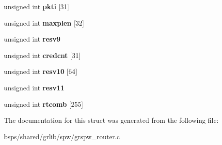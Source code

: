 \begin{DoxyCompactItemize}
unsigned int {\bfseries pkti} \mbox{[}31\mbox{]}
\item 
\mbox{\label{structrouter__regs_a3b7e0036b31bc4daca80498be4947f57}} 
unsigned int {\bfseries maxplen} \mbox{[}32\mbox{]}
\item 
\mbox{\label{structrouter__regs_a97703bdbcb7dabc80b3d2b6e3d6cc9c1}} 
unsigned int {\bfseries resv9}
\item 
\mbox{\label{structrouter__regs_a0169bf6f06108152813ef2ca3832aff3}} 
unsigned int {\bfseries credcnt} \mbox{[}31\mbox{]}
\item 
\mbox{\label{structrouter__regs_a340e7b99756132765e46afaee8dcb8a8}} 
unsigned int {\bfseries resv10} \mbox{[}64\mbox{]}
\item 
\mbox{\label{structrouter__regs_a292b380f19110f75d7c965bdf083ff5a}} 
unsigned int {\bfseries resv11}
\item 
\mbox{\label{structrouter__regs_a24749f8681a1dbc5ec2aa9a61f8b55f8}} 
unsigned int {\bfseries rtcomb} \mbox{[}255\mbox{]}
\end{DoxyCompactItemize}


The documentation for this struct was generated from the following file\+:\begin{DoxyCompactItemize}
\item 
bsps/shared/grlib/spw/grspw\+\_\+router.\+c\end{DoxyCompactItemize}
